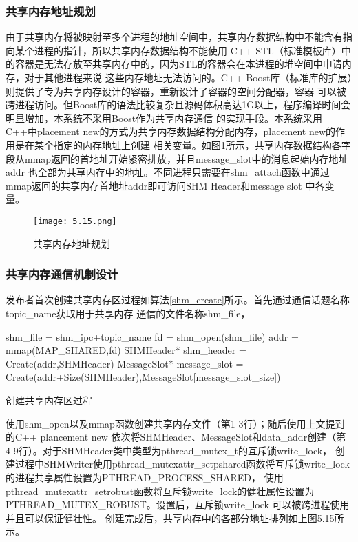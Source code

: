 \subsubsection{共享内存地址规划}
由于共享内存将被映射至多个进程的地址空间中，共享内存数据结构中不能含有指向某个进程的指针，所以共享内存数据结构不能使用
C++ STL（标准模板库）中的容器是无法存放至共享内存中的，因为STL的容器会在本进程的堆空间中申请内存，对于其他进程来说
这些内存地址无法访问的。C++ Boost库（标准库的扩展）则提供了专为共享内存设计的容器，重新设计了容器的空间分配器，容器
可以被跨进程访问。但Boost库的语法比较复杂且源码体积高达1G以上，程序编译时间会明显增加，本系统不采用Boost作为共享内存通信
的实现手段。本系统采用C++中placement new的方式为共享内存数据结构分配内存，placement new的作用是在某个指定的内存地址上创建
相关变量。如图\ref{shm_addr_design}所示，共享内存数据结构各字段从mmap返回的首地址开始紧密排放，并且message\_slot中的消息起始内存地址addr
也全部为共享内存中的地址。不同进程只需要在shm\_attach函数中通过mmap返回的共享内存首地址addr即可访问SHM Header和message slot
中各变量。
\begin{figure}[H]
  \centering
  \texttt{[image: 5.15.png]}
  \caption{共享内存地址规划}
  \label{shm_addr_design}
\end{figure}

\subsubsection{共享内存通信机制设计}
发布者首次创建共享内存区过程如算法\ref{shm_create}所示。首先通过通信话题名称topic\_name获取用于共享内存
通信的文件名称shm\_file，
\begin{algorithm}
  \small
  \SetAlgoLined
  shm\_file = shm\_ipc+topic\_name\;
  fd = shm\_open(shm\_file)\;
  addr = mmap(MAP\_SHARED,fd)\;
  SHMHeader* shm\_header = Create(addr,SHMHeader)\;
  MessageSlot* message\_slot = Create(addr+Size(SHMHeader),MessageSlot[message\_slot\_size])\;
  \caption{创建共享内存区过程}
  \label{shm_create}
\end{algorithm}
使用shm\_open以及mmap函数创建共享内存文件（第1-3行）；随后使用上文提到的C++ plancement new
依次将SHMHeader、MessageSlot和data\_addr创建（第4-9行）。对于SHMHeader类中类型为pthread\_mutex\_t的互斥锁write\_lock，
创建过程中SHMWriter使用pthread\_mutexattr\_setpshared函数将互斥锁write\_lock的进程共享属性设置为PTHREAD\_PROCESS\_SHARED，
使用pthread\_mutexattr\_setrobust函数将互斥锁write\_lock的健壮属性设置为PTHREAD\_MUTEX\_ROBUST。设置后，互斥锁write\_lock
可以被跨进程使用并且可以保证健壮性。
创建完成后，共享内存中的各部分地址排列如上图5.15所示。

